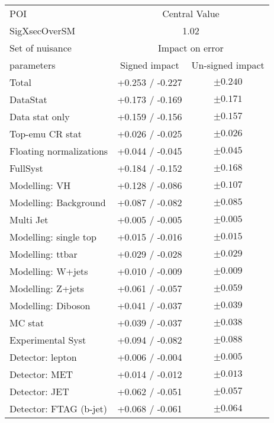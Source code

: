 \begin{table}[h]
\centering
\begin{tabular}{|l|c|c|}
\hline\hline
POI & \multicolumn{2}{c|}{Central Value} \\
SigXsecOverSM & \multicolumn{2}{c|}{1.02} \\ 
\hline \hline
Set of nuisance & \multicolumn{2}{c|}{Impact on error}  \\\hline
 parameters     & Signed impact & Un-signed impact  \\\hline\hline
Total                   & +0.253 / -0.227 & $ \pm 0.240 $ \\\hline
DataStat                 & +0.173 / -0.169 & $ \pm 0.171 $ \\\hline
Data stat only           & +0.159 / -0.156 & $ \pm 0.157 $ \\
Top-emu CR stat          & +0.026 / -0.025 & $ \pm 0.026 $ \\
Floating normalizations  & +0.044 / -0.045 & $ \pm 0.045 $ \\\hline\hline
FullSyst                & +0.184 / -0.152 & $ \pm 0.168 $ \\\hline
Modelling: VH            & +0.128 / -0.086 & $ \pm 0.107 $ \\\hline
Modelling: Background    & +0.087 / -0.082 & $ \pm 0.085 $ \\\hline
Multi Jet                & +0.005 / -0.005 & $ \pm 0.005 $ \\
Modelling: single top    & +0.015 / -0.016 & $ \pm 0.015 $ \\
Modelling: ttbar         & +0.029 / -0.028 & $ \pm 0.029 $ \\
Modelling: W+jets        & +0.010 / -0.009 & $ \pm 0.009 $ \\
Modelling: Z+jets        & +0.061 / -0.057 & $ \pm 0.059 $ \\
Modelling: Diboson       & +0.041 / -0.037 & $ \pm 0.039 $ \\
MC stat                  & +0.039 / -0.037 & $ \pm 0.038 $ \\\hline\hline
Experimental Syst        & +0.094 / -0.082 & $ \pm 0.088 $ \\\hline
Detector: lepton         & +0.006 / -0.004 & $ \pm 0.005 $ \\
Detector: MET            & +0.014 / -0.012 & $ \pm 0.013 $ \\
Detector: JET            & +0.062 / -0.051 & $ \pm 0.057 $ \\
Detector: FTAG (b-jet)   & +0.068 / -0.061 & $ \pm 0.064 $ \\

\end{tabular}
\end{table}
